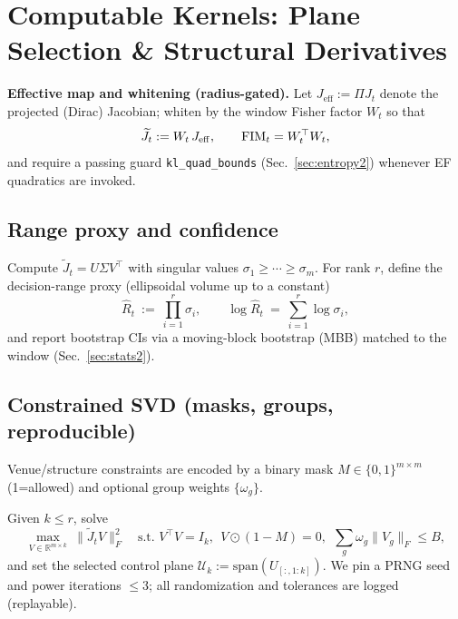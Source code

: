 \section{Computable Kernels: Plane Selection \& Structural Derivatives}\label{sec:kernels2}

\noindent\textbf{Effective map and whitening (radius-gated).}
Let $J_{\mathrm{eff}}:=\Pi J_t$ denote the projected (Dirac) Jacobian; whiten by the window Fisher factor $W_t$ so that
\[
\widetilde J_t := W_t\,J_{\mathrm{eff}}, \qquad \mathrm{FIM}_t=W_t^\top W_t,
\]
and require a passing guard \texttt{kl\_quad\_bounds} (Sec.~\ref{sec:entropy2}) whenever EF quadratics are invoked.

\subsection*{Range proxy and confidence}
Compute $\widetilde J_t=U\Sigma V^\top$ with singular values $\sigma_1\ge\cdots\ge\sigma_m$.
For rank $r$, define the decision-range proxy (ellipsoidal volume up to a constant)
\[
\widehat R_t \ :=\ \prod_{i=1}^r \sigma_i,
\qquad
\log \widehat R_t \ =\ \sum_{i=1}^r \log \sigma_i,
\]
and report bootstrap CIs via a moving-block bootstrap (MBB) matched to the window (Sec.~\ref{sec:stats2}).

\subsection*{Constrained SVD (masks, groups, reproducible)}
Venue/structure constraints are encoded by a binary mask $M\in\{0,1\}^{m\times m}$ (1=allowed) and optional group weights $\{\omega_g\}$.

\begin{definition}\label{def:csvd}
\emph{}
Given $k\!\le\!r$, solve
\[
\max_{V\in\mathbb R^{m\times k}}~ \|\widetilde J_t V\|_F^2
\quad
\text{s.t. } V^\top V=I_k,\ \ V\odot(1{-}M)=0,\ \ \sum_g \omega_g\|V_g\|_F \le B,
\]
and set the selected control plane $\mathcal U_k:=\mathrm{span}(U_{[:,1:k]})$.
We pin a PRNG seed and power iterations $\le 3$; all randomization and tolerances are logged (replayable).
\end{definition}


